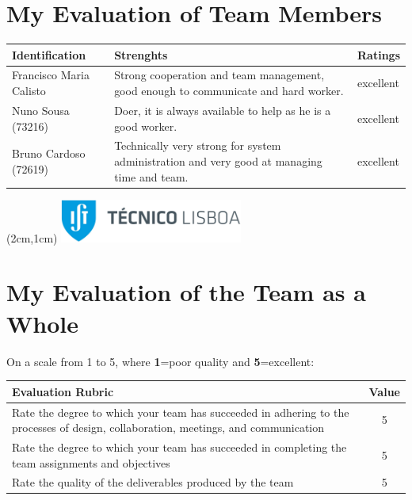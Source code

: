 \documentclass[12pt,a4paper]{article}
\begin{document}
\section{My Evaluation of Team Members}          
\begin{table}[htdp]
\footnotesize
\centering
\begin{tabulary}{\linewidth}{|L|L|l|}
\hline
{}Identification & Strenghts & Ratings \\
\hline
Francisco Maria Calisto & Strong cooperation and team management, good enough to communicate and hard worker. & excellent\\
\hline
Nuno Sousa (73216) & Doer, it is always available to help as he is a good worker. & excellent\\

\hline
Bruno Cardoso (72619) & Technically very strong for system administration and very good at managing time and team. & excellent\\
\hline
\end{tabulary}
\label{tab:team}
\end{table}%
\newpage 
\textblockorigin{-18pt}{-2pt}
\begin{textblock*}{10cm}(2cm,1cm)
\includegraphics[width=6cm]{IST_C_RGB_POS-01-CROP.jpg}
\end{textblock*}
\section{My Evaluation of the Team as a Whole} 
On a scale from 1 to 5, where \textbf{1}=poor quality and \textbf{5}=excellent:

\begin{table}[htdp]
\footnotesize
\centering
\begin{tabulary}{\linewidth}{|L|c|}
\hline
{}Evaluation Rubric & Value \\
\hline
Rate the degree to which your team has succeeded in adhering to the processes of design, collaboration, meetings, and communication & 5 \\ %
\hline
Rate the degree to which your team has succeeded in completing the
team assignments and objectives & 5 \\ %
\hline
Rate the quality of the deliverables produced by the team & 5 \\ %
\hline
\end{tabulary}
\label{tab:team1}
\end{table}%
\end{document}
